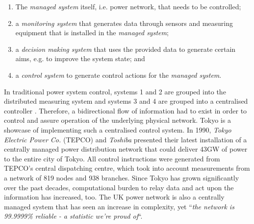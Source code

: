 \begin{enumerate}
	\item The \textit{managed system} itself, i.e. power network, that needs to be controlled;
	\item a \textit{monitoring system} that generates data through sensors and measuring equipment that is installed in the \textit{managed system};
	\item a \textit{decision making system} that uses the provided data to generate certain aims, e.g. to improve the system state; and
	\item a \textit{control system} to generate control actions for the \textit{managed system}.
\end{enumerate}


In traditional power system control, systems 1 and 2 are grouped into the distributed measuring system and systems 3 and 4 are grouped into a centralised controller \cite{Nelson1985}.
Therefore, a bidirectional flow of information had to exist in order to control and assure operation of the underlying physical network.
Tokyo is a showcase of implementing such a centralised control system.
In 1990, \textit{Tokyo Electric Power Co.} (TEPCO) and \textit{Toshiba} presented their latest installation of a centrally managed power distribution network that could deliver 43GW of power to the entire city of Tokyo.
All control instructions were generated from TEPCO's central dispatching centre, which took into account measurements from a network of 819 nodes and 938 branches.
Since Tokyo has grown significantly over the past decades, computational burden to relay data and act upon the information has increased, too.
The UK power network is also a centrally managed system that has seen an increase in complexity, yet ``\textit{the network is 99.9999\% reliable - a statistic we're proud of}``\cite{NationalGrid2017}.



